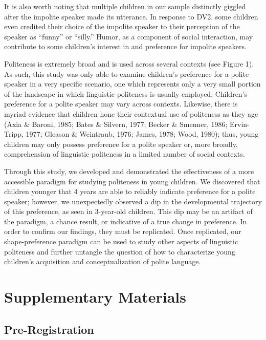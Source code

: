 \documentclass[
  english,
  man,floatsintext]{apa6}
\begin{document}
It is also worth noting that multiple children in our sample distinctly giggled after the impolite speaker made its utterance. In response to DV2, some children even credited their choice of the impolite speaker to their perception of the speaker as ``funny'' or ``silly.'' Humor, as a component of social interaction, may contribute to some children's interest in and preference for impolite speakers.

Politeness is extremely broad and is used across several contexts (see Figure 1). As such, this study was only able to examine children's preference for a polite speaker in a very specific scenario, one which represents only a very small portion of the landscape in which linguistic politeness is usually employed. Children's preference for a polite speaker may vary across contexts. Likewise, there is myriad evidence that children hone their contextual use of politeness as they age (Axia \& Baroni, 1985; Bates \& Silvern, 1977; Becker \& Smenner, 1986; Ervin-Tripp, 1977; Gleason \& Weintraub, 1976; James, 1978; Wood, 1980); thus, young children may only possess preference for a polite speaker or, more broadly, comprehension of linguistic politeness in a limited number of social contexts.

Through this study, we developed and demonstrated the effectiveness of a more accessible paradigm for studying politeness in young children. We discovered that children younger that 4 years are able to reliably indicate preference for a polite speaker; however, we unexpectedly observed a dip in the developmental trajectory of this preference, as seen in 3-year-old children. This dip may be an artifact of the paradigm, a chance result, or indicative of a true change in preference. In order to confirm our findings, they must be replicated. Once replicated, our shape-preference paradigm can be used to study other aspects of linguistic politeness and further untangle the question of how to characterize young children's acquisition and conceptualization of polite language.

\hypertarget{supplementary-materials}{%
\section{Supplementary Materials}\label{supplementary-materials}}

\hypertarget{pre-registration}{%
\subsection{Pre-Registration}\label{pre-registration}}
\end{document}
